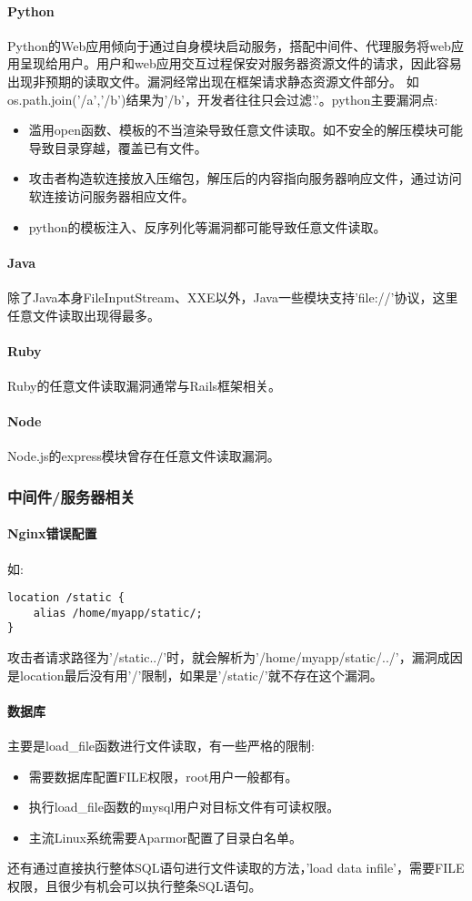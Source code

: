 \paragraph*{Python}
Python的Web应用倾向于通过自身模块启动服务，搭配中间件、代理服务将web应用呈现给用户。用户和web应用交互过程保安对服务器资源文件的请求，因此容易出现非预期的读取文件。漏洞经常出现在框架请求静态资源文件部分。
如os.path.join('/a','/b')结果为'/b'，开发者往往只会过滤'.'。python主要漏洞点:
\begin{itemize}
    \item 滥用open函数、模板的不当渲染导致任意文件读取。如不安全的解压模块可能导致目录穿越，覆盖已有文件。
    \item 攻击者构造软连接放入压缩包，解压后的内容指向服务器响应文件，通过访问软连接访问服务器相应文件。
    \item python的模板注入、反序列化等漏洞都可能导致任意文件读取。
\end{itemize}

\paragraph*{Java}
除了Java本身FileInputStream、XXE以外，Java一些模块支持'file://'协议，这里任意文件读取出现得最多。

\paragraph*{Ruby}
Ruby的任意文件读取漏洞通常与Rails框架相关。
\paragraph*{Node}
Node.js的express模块曾存在任意文件读取漏洞。

\subsubsection*{中间件/服务器相关}
\paragraph*{Nginx错误配置}
如:
\begin{lstlisting}
location /static {
    alias /home/myapp/static/;
}
\end{lstlisting}
攻击者请求路径为'/static../'时，就会解析为'/home/myapp/static/../'，漏洞成因是location最后没有用'/'限制，如果是'/static/'就不存在这个漏洞。

\paragraph*{数据库}
主要是load\_file函数进行文件读取，有一些严格的限制:
\begin{itemize}
    \item 需要数据库配置FILE权限，root用户一般都有。
    \item 执行load\_file函数的mysql用户对目标文件有可读权限。
    \item 主流Linux系统需要Aparmor配置了目录白名单。
\end{itemize}
还有通过直接执行整体SQL语句进行文件读取的方法，'load data infile'，需要FILE权限，且很少有机会可以执行整条SQL语句。

